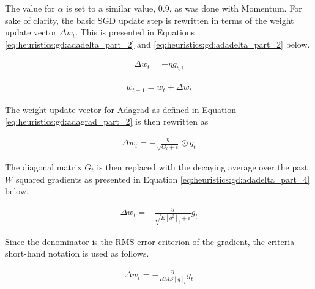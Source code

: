 The value for $\alpha$ is set to a similar value, 0.9, as was done with \ac{Momentum}. For sake of clarity, the basic \ac{SGD} update step is rewritten in terms of the weight update vector $\Delta w_{t}$. This is presented in Equations \ref{eq:heuristics:gd:adadelta_part_2} and \ref{eq:heuristics:gd:adadelta_part_2} below.

\begin{equation}
    \label{eq:heuristics:gd:adadelta_part_2}
    \begin{split}
        \Delta w_{t} = -\eta g_{t,i}
    \end{split}
\end{equation}

\begin{equation}
    \label{eq:heuristics:gd:adadelta_part_3}
    \begin{split}
        w_{t+1} = w_{t} + \Delta w_{t}
    \end{split}
\end{equation}

The weight update vector for \ac{Adagrad} as defined in Equation \ref{eq:heuristics:gd:adagrad_part_2} is then rewritten as 


\begin{equation}
    \label{eq:heuristics:gd:adagrad_part_2_new}
    \begin{split}
        \Delta w_{t} = - \frac{\eta}{\sqrt{G_{t} + \epsilon}} \odot g_{t}
    \end{split}
\end{equation}

The diagonal matrix $G_{t}$ is then replaced with the decaying average over the past $W$ squared gradients as presented in Equation \ref{eq:heuristics:gd:adadelta_part_4} below.

\begin{equation}
    \label{eq:heuristics:gd:adadelta_part_4}
    \begin{split}
        \Delta w_{t} = - \frac{\eta}{\sqrt{E[g^{2}]_{t} + \epsilon}} g_{t}
    \end{split}
\end{equation}

Since the denominator is the \ac{RMS} error criterion of the gradient, the criteria short-hand notation is used as follows.

\begin{equation}
    \label{eq:heuristics:gd:adadelta_part_5}
    \begin{split}
        \Delta w_{t} = - \frac{\eta}{RMS[g]_{t}} g_{t}
    \end{split}
\end{equation}

